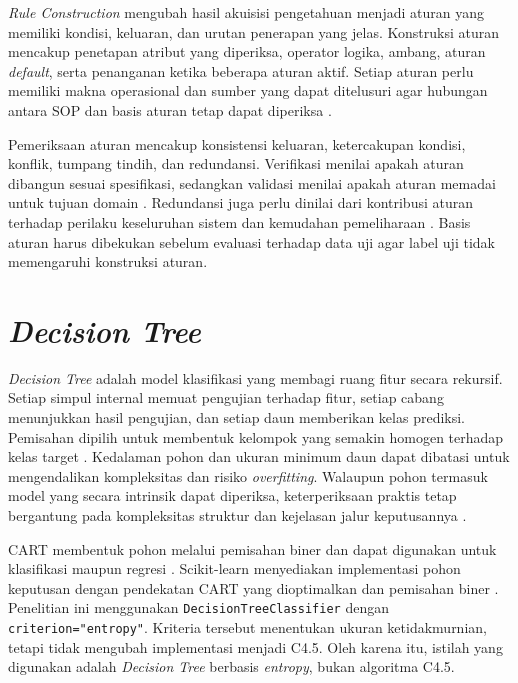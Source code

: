 \textit{Rule Construction} mengubah hasil akuisisi pengetahuan menjadi aturan yang memiliki kondisi, keluaran, dan urutan penerapan yang jelas. Konstruksi aturan mencakup penetapan atribut yang diperiksa, operator logika, ambang, aturan \textit{default}, serta penanganan ketika beberapa aturan aktif. Setiap aturan perlu memiliki makna operasional dan sumber yang dapat ditelusuri agar hubungan antara SOP dan basis aturan tetap dapat diperiksa \cite{StuderEtAl1998}.

Pemeriksaan aturan mencakup konsistensi keluaran, ketercakupan kondisi, konflik, tumpang tindih, dan redundansi. Verifikasi menilai apakah aturan dibangun sesuai spesifikasi, sedangkan validasi menilai apakah aturan memadai untuk tujuan domain \cite{Meseguer1992}. Redundansi juga perlu dinilai dari kontribusi aturan terhadap perilaku keseluruhan sistem dan kemudahan pemeliharaan \cite{BenDavid2008}. Basis aturan harus dibekukan sebelum evaluasi terhadap data uji agar label uji tidak memengaruhi konstruksi aturan.

\section{\textit{Decision Tree}}

\textit{Decision Tree} adalah model klasifikasi yang membagi ruang fitur secara rekursif. Setiap simpul internal memuat pengujian terhadap fitur, setiap cabang menunjukkan hasil pengujian, dan setiap daun memberikan kelas prediksi. Pemisahan dipilih untuk membentuk kelompok yang semakin homogen terhadap kelas target \cite{Quinlan1986,JamesEtAl2023}. Kedalaman pohon dan ukuran minimum daun dapat dibatasi untuk mengendalikan kompleksitas dan risiko \textit{overfitting}. Walaupun pohon termasuk model yang secara intrinsik dapat diperiksa, keterperiksaan praktis tetap bergantung pada kompleksitas struktur dan kejelasan jalur keputusannya \cite{RudinEtAl2022}.

CART membentuk pohon melalui pemisahan biner dan dapat digunakan untuk klasifikasi maupun regresi \cite{BreimanEtAl1984}. Scikit-learn menyediakan implementasi pohon keputusan dengan pendekatan CART yang dioptimalkan dan pemisahan biner \cite{PedregosaEtAl2011,ScikitLearnTreeGuide}. Penelitian ini menggunakan \texttt{DecisionTreeClassifier} dengan \texttt{criterion="entropy"}. Kriteria tersebut menentukan ukuran ketidakmurnian, tetapi tidak mengubah implementasi menjadi C4.5. Oleh karena itu, istilah yang digunakan adalah \textit{Decision Tree} berbasis \textit{entropy}, bukan algoritma C4.5.

